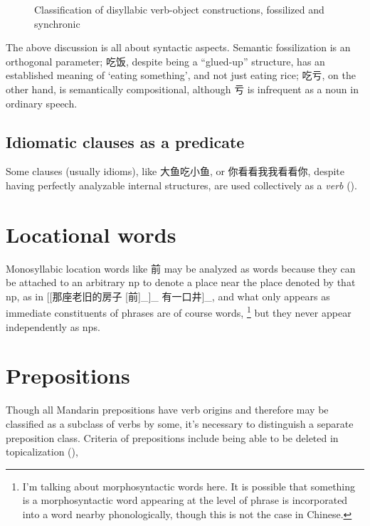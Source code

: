 \documentclass[UTF8, a4paper, oneside, scheme=plain, 12pt]{ctexrep}
\newcommand{\translate}[1]{`#1'}
\begin{document}
\begin{figure}[H]
    \centering
    \caption{Classification of disyllabic verb-object constructions, 
    \label{fig:verb-object-classification}
    fossilized and synchronic}
    {\small }
\end{figure}

The above discussion is all about syntactic aspects. 
Semantic fossilization is an orthogonal parameter; 
吃饭, despite being a ``glued-up'' structure, 
has an established meaning of \translate{eating something}, 
and not just eating rice; 
吃亏, on the other hand, is semantically compositional, 
although 亏 is infrequent as a noun in ordinary speech. 

\subsection{Idiomatic clauses as a predicate}

Some clauses (usually idioms), like 大鱼吃小鱼, or 你看看我我看看你,
despite having perfectly analyzable internal structures, 
are used collectively as a \emph{verb} ().

\section{Locational words}\label{sec:pos.locational}

Monosyllabic location words like 前 may be analyzed as words 
because they can be attached to an arbitrary \ac{np} 
to denote a place near the place denoted by that \ac{np},
as in [[那座老旧的房子 [前]_{}]_{} 有一口井]_{},
and what only appears as immediate constituents of phrases are of course words,%
\footnote{
    I'm talking about morphosyntactic words here.
    It is possible that something is a morphosyntactic word 
    appearing at the level of phrase
    is incorporated into a word nearby phonologically,
    though this is not the case in Chinese.
}%
but they never appear independently as \ac{np}s.


\section{Prepositions}\label{sec:preposition-pos}

Though all Mandarin prepositions have verb origins 
and therefore may be classified as a subclass of verbs by some,
it's necessary to distinguish a separate preposition class.
Criteria of prepositions include 
being able to be deleted in topicalization
(), 
\end{document}
